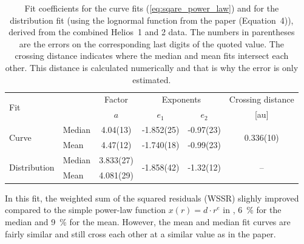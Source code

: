 \begin{table}
	\caption{Fit coefficients for the curve fits (\autoref{eq:sqare_power_law}) and for the distribution fit (using the lognormal function from the paper (Equation~4)), derived from the combined Helios~1 and 2 data. The numbers in parentheses are the errors on the corresponding last digits of the quoted value. The crossing distance indicates where the median and mean fits intersect each other. This distance is calculated numerically and that is why the error is only estimated.}
	\label{tab:bfield_fit_parameters}
	\centering
	\begin{tabular}{l l c c c c}
		\hline\hline
		\multirow{2}{*}{Fit}	&	&Factor	&\multicolumn{2}{c}{Exponents}	&Crossing distance\\
		\cline{4-5}
			&	&$a$	&$e_1$	&$e_2$	&[au]\\
		\hline
		\multirow{2}{*}{Curve}	&Median	&4.04(13)	&-1.852(25)	&-0.97(23)	&\multirow{2}{*}{0.336(10)}\\
			&Mean	&4.47(12)	&-1.740(18)	&-0.99(23)	&\\
		\multirow{2}{*}{Distribution}	&Median	&3.833(27)	&\multirow{2}{*}{-1.858(42)}	&\multirow{2}{*}{-1.32(12)}	&\multirow{2}{*}{--}\\
			&Mean	&4.081(29)	&	&	&\\
		\hline
	\end{tabular}
\end{table}
%

In this fit, the weighted sum of the squared residuals (WSSR) slighly improved compared to the simple power-law function $x(r) = d \cdot r^e$ in \citet{Venzmer2017}, \SI{6}{\%} for the median and \SI{9}{\%} for the mean. However, the mean and median fit curves are fairly similar and still cross each other at a similar value as in the paper.\\

